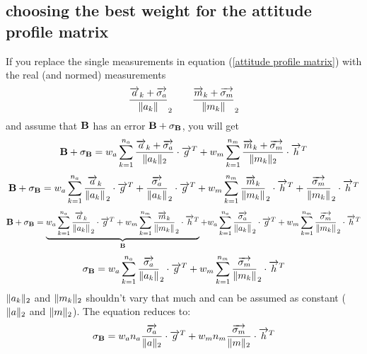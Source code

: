 \subsection{choosing the best weight for the attitude profile matrix}
If you replace the single measurements in equation (\ref{attitude profile matrix}) with the real (and normed) measurements
\begin{equation}
\frac{\overrightarrow{a}_k + \overrightarrow{\sigma_a}}{\Vert{a_k}\Vert}_2 \quad \quad \frac{\overrightarrow{m}_k + \overrightarrow{\sigma_m}}{\Vert{m_k}\Vert}_2
\end{equation}
and assume that $\mathbf{B}$ has an error $\mathbf{B} +\mathbf{\sigma_B} $, you will get
\begin{equation}
\mathbf{B} +\mathbf{\sigma_B} = w_a \sum_{k=1}^{n_a} \frac{\overrightarrow{a}_k + \overrightarrow{\sigma_a}}{\Vert{a_k}\Vert_2} \cdot \overrightarrow{g}^{T}  +  w_m \sum_{k=1}^{n_m} \frac{\overrightarrow{m}_k + \overrightarrow{\sigma_m}}{\Vert{m_k}\Vert_2} \cdot \overrightarrow{h}^{T}
\end{equation}
\begin{equation}
\mathbf{B} +\mathbf{\sigma_B} = w_a \sum_{k=1}^{n_a} \frac{\overrightarrow{a}_k}{\Vert{a_k}\Vert}_2 \cdot \overrightarrow{g}^{T} + \frac{\overrightarrow{\sigma_a}}{\Vert{a_k}\Vert}_2 \cdot \overrightarrow{g}^{T} + w_m \sum_{k=1}^{n_m} \frac{\overrightarrow{m}_k}{\Vert{m_k}\Vert}_2 \cdot \overrightarrow{h}^{T} + \frac{\overrightarrow{\sigma_m}}{\Vert{m_k}\Vert}_2 \cdot \overrightarrow{h}^{T}
\end{equation}
\begin{equation}
\mathbf{B} +\mathbf{\sigma_B} = \underbrace{w_a \sum_{k=1}^{n_a} \frac{\overrightarrow{a}_k}{\Vert{a_k}\Vert}_2\cdot \overrightarrow{g}^{T} + w_m \sum_{k=1}^{n_m} \frac{\overrightarrow{m}_k}{\Vert{m_k}\Vert}_2 \cdot \overrightarrow{h}^{T}}_{\mathbf{B}} + w_a \sum_{k=1}^{n_a} \frac{\overrightarrow{\sigma_a}}{\Vert{a_k}\Vert}_2 \cdot \overrightarrow{g}^{T} + w_m \sum_{k=1}^{n_m} \frac{\overrightarrow{\sigma_m}}{\Vert{m_k}\Vert}_2 \cdot \overrightarrow{h}^{T}
\end{equation}
\begin{equation}
\mathbf{\sigma_B} = w_a \sum_{k=1}^{n_a} \frac{\overrightarrow{\sigma_a}}{\Vert{a_k}\Vert}_2 \cdot \overrightarrow{g}^{T} + w_m \sum_{k=1}^{n_m} \frac{\overrightarrow{\sigma_m}}{\Vert{m_k}\Vert}_2 \cdot \overrightarrow{h}^{T}
\end{equation}
$\Vert{a_k}\Vert_2$ and $\Vert{m_k}\Vert_2$ shouldn't vary that much and can be assumed as constant ($\Vert{a}\Vert_2$ and $\Vert{m}\Vert_2$). The equation reduces to:
\begin{equation}
\mathbf{\sigma_B} = w_a n_a \frac{\overrightarrow{\sigma_a}}{\Vert{a}\Vert_2}\cdot \overrightarrow{g}^{T} + w_m n_m \frac{\overrightarrow{\sigma_m}}{\Vert{m}\Vert_2} \cdot \overrightarrow{h}^{T}
\end{equation}

